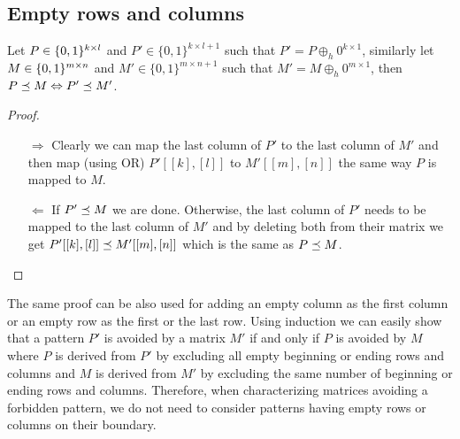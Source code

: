 \subsection{Empty rows and columns}
\begin{obs}
Let $P\in\{0,1\}^{k\times l}$ and $P'\in\{0,1\}^{k\times l+1}$ such that $P'=P\oplus_h0^{k\times1}$, similarly let $M\in\{0,1\}^{m\times n}$ and $M'\in\{0,1\}^{m\times n+1}$ such that $M'=M\oplus_h0^{m\times1}$, then $P\preceq M\Leftrightarrow P'\preceq M'$.
\end{obs}
\begin{proof}
\begin{itemize}
\item[$\Rightarrow$] Clearly we can map the last column of $P'$ to the last column of $M'$ and then map (using OR) $P'[[k],[l]]$ to $M'[[m],[n]]$ the same way $P$ is mapped to $M$.
\item[$\Leftarrow$] If $P'\preceq M$ we are done. Otherwise, the last column of $P'$ needs to be mapped to the last column of $M'$ and by deleting both from their matrix we get $P'[[k],[l]]\preceq M'[[m],[n]]$ which is the same as $P\preceq M$.
\end{itemize}
\end{proof}

The same proof can be also used for adding an empty column as the first column or an empty row as the first or the last row. Using induction we can easily show that a pattern $P'$ is avoided by a matrix $M'$ if and only if $P$ is avoided by $M$ where $P$ is derived from $P'$ by excluding all empty beginning or ending rows and columns and $M$ is derived from $M'$ by excluding the same number of beginning or ending rows and columns. Therefore, when characterizing matrices avoiding a forbidden pattern, we do not need to consider patterns having empty rows or columns on their boundary.

